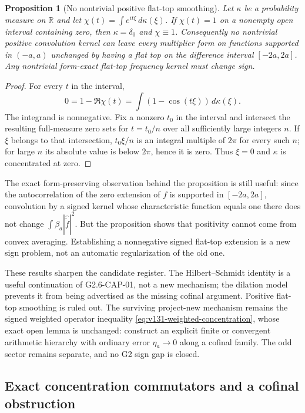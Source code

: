 \documentclass[11pt]{article}
\newtheorem{proposition}[theorem]{Proposition}
\theoremstyle{remark}
\begin{document}
\begin{proposition}[No nontrivial positive flat-top smoothing]
\label{prop:v132-flat-top}
Let $\kappa$ be a probability measure on $\mathbb R$ and let
$\chi(t)=\int e^{it\xi}\,d\kappa(\xi)$. If $\chi(t)=1$ on a nonempty
open interval containing zero, then $\kappa=\delta_0$ and
$\chi\equiv1$. Consequently no nontrivial positive convolution kernel
can leave every multiplier form on functions supported in $(-a,a)$
unchanged by having a flat top on the difference interval $[-2a,2a]$.
Any nontrivial form-exact flat-top frequency kernel must change sign.
\end{proposition}
\begin{proof}
For every $t$ in the interval,
\[
 0=1-\Re\chi(t)=\int(1-\cos(t\xi))\,d\kappa(\xi).
\]
The integrand is nonnegative. Fix a nonzero $t_0$ in the interval and
intersect the resulting full-measure zero sets for $t=t_0/n$ over all
sufficiently large integers $n$. If $\xi$ belongs to that intersection,
$t_0\xi/n$ is an integral multiple of $2\pi$ for every such $n$; for
large $n$ its absolute value is below $2\pi$, hence it is zero. Thus
$\xi=0$ and $\kappa$ is concentrated at zero.
\end{proof}

The exact form-preserving observation behind the proposition is still
useful: since the autocorrelation of the zero extension of $f$ is
supported in $[-2a,2a]$, convolution by a signed kernel whose
characteristic function equals one there does not change
$\int\beta_a|\widehat{\widetilde f}|^2$. But the proposition shows
that positivity cannot come from convex averaging. Establishing a
nonnegative signed flat-top extension is a new sign problem, not an
automatic regularization of the old one.

These results sharpen the candidate register. The Hilbert--Schmidt
identity is a useful continuation of G2.6-CAP-01, not a new mechanism;
the dilation model prevents it from being advertised as the missing
cofinal argument. Positive flat-top smoothing is ruled out. The
surviving project-new mechanism remains the signed weighted operator
inequality \eqref{eq:v131-weighted-concentration}, whose exact open
lemma is unchanged: construct an explicit finite or convergent
arithmetic hierarchy with ordinary error $\eta_a\to0$ along a cofinal
family. The odd sector remains separate, and no G2 sign gap is closed.

\subsection*{Exact concentration commutators and a cofinal obstruction}
\end{document}
